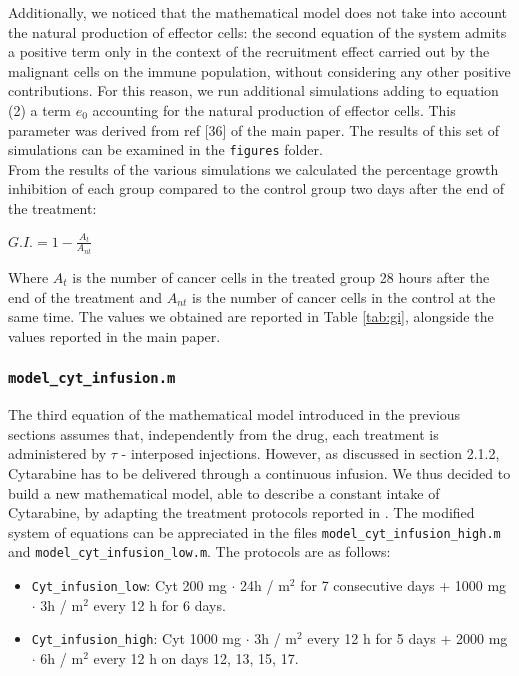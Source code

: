 Additionally, we noticed that the mathematical model does not take into account the natural production of effector cells: the second equation of the system admits a positive term only in the context of the recruitment effect carried out by the malignant cells on the immune population, without considering any other positive contributions. For this reason, we run additional simulations adding to equation (2) a term $e_0$ accounting for the natural production of effector cells. This parameter was derived from ref [36] of the main paper. The results of this set of simulations can be examined in the \texttt{figures} folder. \\
From the results of the various simulations we calculated the percentage growth inhibition of each group compared to the control group two days after the end of the treatment:

$G.I. = 1 - \frac{A_t}{A_{nt}}$ 

Where $A_t$ is the number of cancer cells in the treated group 28 hours after the end of the treatment and $A_{nt}$ is the number of cancer cells in the control at the same time. The values we obtained are reported in Table \ref{tab:gi}, alongside the values reported in the main paper.

\subsubsection{\texttt{model\_cyt\_infusion.m}}
The third equation of the mathematical model introduced in the previous sections assumes that, independently from the drug, each treatment is administered by $\tau$ - interposed injections. However, as discussed in section 2.1.2, Cytarabine has to be delivered through a continuous infusion. 
We thus decided to build a new mathematical model, able to describe a constant intake of Cytarabine, by adapting the treatment protocols reported in \cite{cyt-3}. The modified system of equations can be appreciated in the files \texttt{model\_cyt\_infusion\_high.m} and \texttt{model\_cyt\_infusion\_low.m}. The protocols are as follows:

\begin{itemize}
	\item \texttt{Cyt\_infusion\_low}: Cyt 200 mg $\cdot$ 24h / m$^2$ for 7 consecutive days + 1000 mg $\cdot$ 3h / m$^2$ every 12 h for 6 days.
	\item \texttt{Cyt\_infusion\_high}: Cyt 1000 mg $\cdot$ 3h / m$^2$ every 12 h for 5 days + 2000 mg $\cdot$ 6h / m$^2$ every 12 h on days 12, 13, 15, 17.
\end{itemize}

